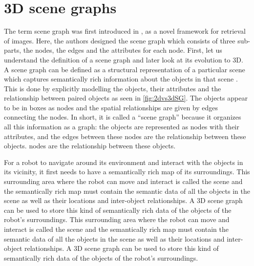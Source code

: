 \section{3D scene graphs}
The term scene graph was first introduced in \cite{7298990}, as a novel framework for retrieval of images. Here, the authors designed the scene graph which 
consists of three sub-parts, the nodes, the edges and the attributes for each node. First, let us understand the definition of a scene graph and later
look at its evolution to 3D. \\
A scene graph can be defined as a structural representation of a particular scene which captures semantically rich information about the objects in that scene \cite{zhu2022scenegraphgenerationcomprehensive}.
This is done by explicitly modelling the objects, their attributes and the relationship between paired objects as seen in \cref{fig:2dvs3dSG}. The objects appear to be in boxes as nodes
and the spatial relationships are given by edges connecting the nodes.
In short, it is called a “scene graph” because it organizes all this information as a graph: the objects are represented as nodes with their attributes, and the edges between these 
nodes are the relationship between these objects. 
nodes are the relationship between these objects. 

For a robot to navigate around its environment and interact with the objects in its vicinity, it first needs to have a semantically rich map of its surroundings. 
This surrounding area where the robot can move and interact is called the scene and the semantically rich map must contain the 
semantic data of all the objects in the scene as well as their locations and inter-object relationships. 
A 3D scene graph can be used to store this kind of semantically rich data of the objects of the robot’s surroundings. 
This surrounding area where the robot can move and interact is called the scene and the semantically rich map must contain the 
semantic data of all the objects in the scene as well as their locations and inter-object relationships. 
A 3D scene graph can be used to store this kind of semantically rich data of the objects of the robot’s surroundings. 


